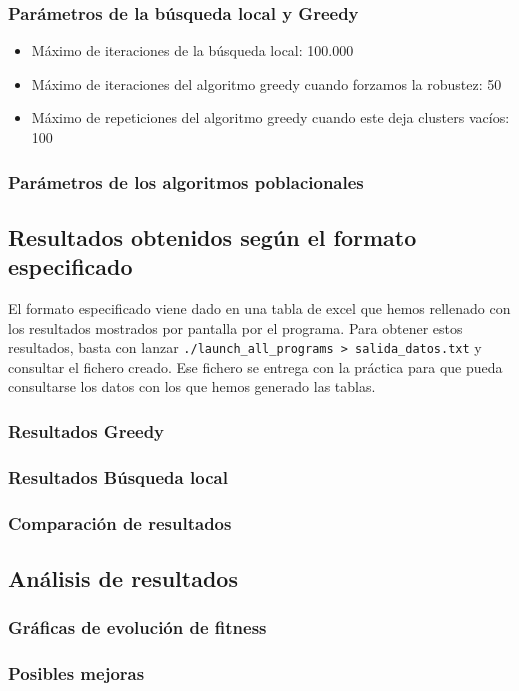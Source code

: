 \documentclass[11pt]{article}
\begin{document}
\subsubsection{Parámetros de la búsqueda local y Greedy}

\begin{itemize}
    \item Máximo de iteraciones de la búsqueda local: 100.000
    \item Máximo de iteraciones del algoritmo greedy cuando forzamos la robustez: 50
    \item Máximo de repeticiones del algoritmo greedy cuando este deja clusters vacíos: 100
\end{itemize}

\subsubsection{Parámetros de los algoritmos poblacionales} \label{section:parametros_poblacionales}


\pagebreak

\subsection{Resultados obtenidos según el formato especificado}

El formato especificado viene dado en una tabla de excel que hemos rellenado con los resultados mostrados por pantalla por el programa. Para obtener estos resultados, basta con lanzar \lstinline{./launch_all_programs > salida_datos.txt} y consultar el fichero creado. Ese fichero se entrega con la práctica para que pueda consultarse los datos con los que hemos generado las tablas.

\subsubsection{Resultados Greedy}

\subsubsection{Resultados Búsqueda local}

\subsubsection{Comparación de resultados}


\subsection{Análisis de resultados}

\subsubsection{Gráficas de evolución de fitness}

\subsubsection{Posibles mejoras}
\end{document}
